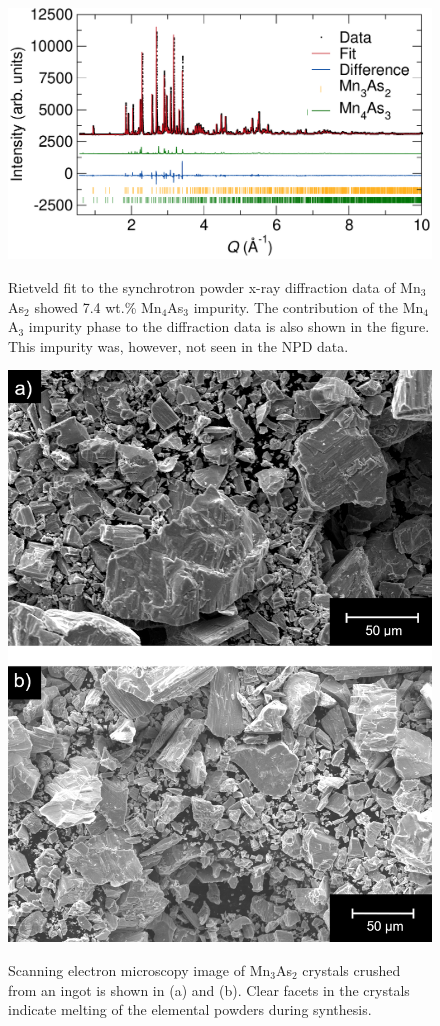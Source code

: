 \documentclass[10pt,doublespacing,edeposit]{uiucthesis2020}
\begin{document}
\begin{mainmatter}
\begin{figure}[h]
\centering\includegraphics[width=0.7\columnwidth]{figures/ch6/6121_Mn3As2_cropped.pdf} \\
\caption{\label{fig:11BM_data}
Rietveld fit to the synchrotron powder x-ray diffraction data of Mn$_3$As$_2$ showed 7.4 wt.\% Mn$_4$As$_3$ impurity. The contribution of the Mn$_4$A$_3$ impurity phase to the diffraction data is also shown in the figure. This impurity was, however, not seen in the NPD data.
} 
\end{figure}

\begin{figure}
\centering\includegraphics[width=0.7\columnwidth]{figures/ch6/Mn3As2_SEM_image.png} \\
\caption{\label{fig:SEM_image}
Scanning electron microscopy image of Mn$_3$As$_2$ crystals crushed from an ingot is shown in (a) and (b). Clear facets in the crystals indicate melting of the elemental powders during synthesis. 
} 
\end{figure}


\end{mainmatter}
\end{document}
